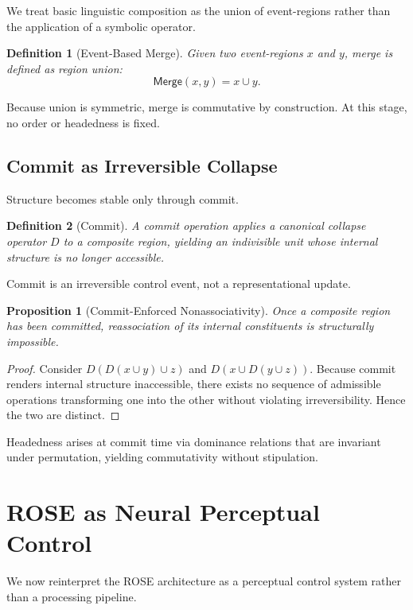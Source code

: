 \documentclass[11pt]{article}
\newtheorem{definition}{Definition}
\newtheorem{proposition}{Proposition}
\begin{document}
We treat basic linguistic composition as the union of event-regions rather than the application of a symbolic operator.

\begin{definition}[Event-Based Merge]
Given two event-regions $x$ and $y$, merge is defined as region union:
\[
\mathsf{Merge}(x,y) = x \cup y .
\]
\end{definition}

Because union is symmetric, merge is commutative by construction. At this stage, no order or headedness is fixed.

\subsection{Commit as Irreversible Collapse}

Structure becomes stable only through commit.

\begin{definition}[Commit]
A commit operation applies a canonical collapse operator $D$ to a composite region, yielding an indivisible unit whose internal structure is no longer accessible.
\end{definition}

Commit is an irreversible control event, not a representational update.

\begin{proposition}[Commit-Enforced Nonassociativity]
Once a composite region has been committed, reassociation of its internal constituents is structurally impossible.
\end{proposition}

\begin{proof}
Consider $D(D(x \cup y) \cup z)$ and $D(x \cup D(y \cup z))$. Because commit renders internal structure inaccessible, there exists no sequence of admissible operations transforming one into the other without violating irreversibility. Hence the two are distinct.
\end{proof}

Headedness arises at commit time via dominance relations that are invariant under permutation, yielding commutativity without stipulation.

\section{ROSE as Neural Perceptual Control}

We now reinterpret the ROSE architecture as a perceptual control system rather than a processing pipeline.
\end{document}
